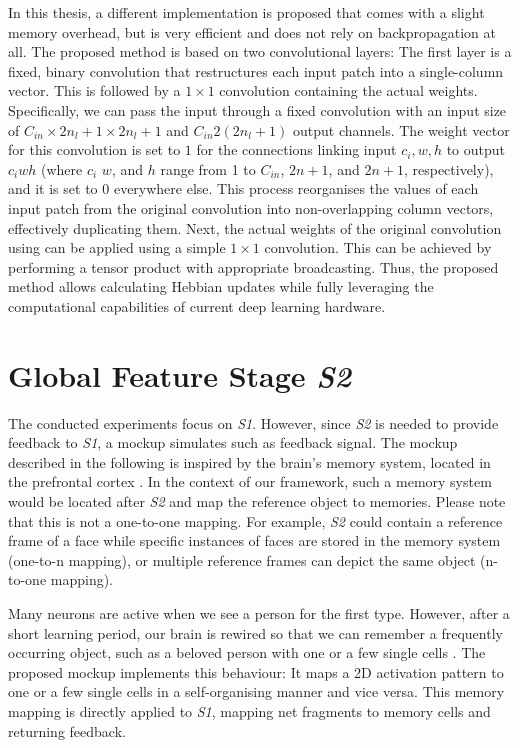 In this thesis, a different implementation is proposed that comes with a slight memory overhead, but is very efficient and does not rely on backpropagation at all. The proposed method is based on two convolutional layers: The first layer is a fixed, binary convolution that restructures each input patch into a single-column vector. This is followed by a $1\times1$ convolution containing the actual weights. Specifically, we can pass the input through a fixed convolution with an input size of $C_{in} \times 2n_l+1 \times 2n_l+1$ and $C_{in} 2(2n_l+1)$ output channels. The weight vector for this convolution is set to $1$ for the connections linking input $c_i,w,h$ to output $c_iwh$ (where $c_i$ $w$, and $h$ range from 1 to $C_{in}$, $2n+1$, and $2n+1$, respectively), and it is set to 0 everywhere else. This process reorganises the values of each input patch from the original convolution into non-overlapping column vectors, effectively duplicating them. Next, the actual weights of the original convolution using can be applied using a simple $1\times1$ convolution. This can be achieved by performing a tensor product with appropriate broadcasting.
Thus, the proposed method allows calculating Hebbian updates while fully leveraging the computational capabilities of current deep learning hardware.








\section{Global Feature Stage \emph{S2}}
The conducted experiments focus on \emph{S1}.
However, since \emph{S2} is needed to provide feedback to \emph{S1}, a mockup simulates such as feedback signal.
The mockup described in the following is inspired by the brain's memory system, located in the prefrontal cortex .
In the context of our framework, such a memory system would be located after \emph{S2} and map the reference object to memories.
Please note that this is not a one-to-one mapping. For example, \emph{S2} could contain a reference frame of a face while specific instances of faces are stored in the memory system (one-to-n mapping), or multiple reference frames can depict the same object (n-to-one mapping).

Many neurons are active when we see a person for the first type.
However, after a short learning period, our brain is rewired so that we can remember a frequently occurring object, such as a beloved person with one or a few single cells .
The proposed mockup implements this behaviour: It maps a 2D activation pattern to one or a few single cells in a self-organising manner and vice versa.
This memory mapping is directly applied to \emph{S1}, mapping net fragments to memory cells and returning feedback.



